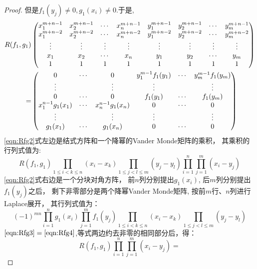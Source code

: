 \begin{proof}
  但是$f_1(y_j)\neq 0, g_1(x_i)\neq 0$.于是,
  \begin{align}\label{eqn:Rfg2}
    R(f_1,g_1)&
    \begin{pmatrix}
    x_1^{m+n-1}&x_2^{m+n-1}&\cdots&x_n^{m+n-1}&y_1^{m+n-1}&y_2^{m+n-1}&\cdots&y_m^{m+n-1}\\
    x_1^{m+n-2}&x_2^{m+n-2}&\cdots&x_n^{m+n-2}&y_1^{m+n-2}&y_2^{m+n-2}&\cdots&y_m^{m+n-2}\\
    \vdots&\vdots&\vdots&\vdots&\vdots&\vdots&\vdots&\vdots\\
    x_1 & x_2 & \cdots & x_n & y_1 & y_2 & \cdots & y_m\\
    1 & 1 & 1 & 1 & 1 & 1 & 1 & 1
    \end{pmatrix}\notag\\
    =&
                  \begin{pmatrix}
                    0 & \cdots & 0 & y_1^{m-1}f_1(y_1) & \cdots & y_m^{m-1}f_1(y_m)\\
                    \vdots & & \vdots & \vdots & & \vdots\\
                    0 & \cdots & 0 & f_1(y_1) & \cdots & f_1(y_m)\\
                    x_1^{n-1}g_1(x_1) & \cdots & x_n^{n-1}g_1(x_n) & 0 & \cdots & 0\\
                    \vdots & & \vdots & \vdots & & \vdots\\
                    g_1(x_1) & \cdots & g_1(x_n) & 0 & \cdots & 0
                  \end{pmatrix}
  \end{align}
  \eqref{eqn:Rfg2}式左边是结式方阵和一个降幂的Vander Monde矩阵的乘积，
  其乘积的行列式值为:
  \begin{equation}\label{eqn:Rfg3}
    R(f_1,g_1)\prod_{1\leq i < k\leq n}(x_i-x_k)
    \prod_{1\leq j < l\leq m}(y_j-y_l)\prod_{i=1}^n\prod_{j=1}^m(x_i-y_j)
  \end{equation}
  \eqref{eqn:Rfg2}式右边是一个分块对角方阵，
  前$n$列分别提出$g_1(x_i)$, 后$m$列分别提出$f_1(y_j)$之后，
  剩下非零部分是两个降幂Vander Monde矩阵,
  按前$m$行、$n$列进行Laplace展开，
  其行列式值为：
  \begin{equation}\label{eqn:Rfg4}
    (-1)^{mn}\prod_{i=1}^ng_1(x_i)\prod_{j=1}^mf_1(y_j)
    \prod_{1\leq i < k\leq n}(x_i-x_k)\prod_{1\leq j < l\leq m}(y_j-y_l)
  \end{equation}
  $\eqref{eqn:Rfg3}=\eqref{eqn:Rfg4}$,等式两边约去非零的相同部分后，得：
  \begin{equation}\label{eqn:Rfg5}
    R(f_1,g_1)\prod_{i=1}^n\prod_{j=1}^m(x_i-y_j) =

\end{equation}
\end{proof}
